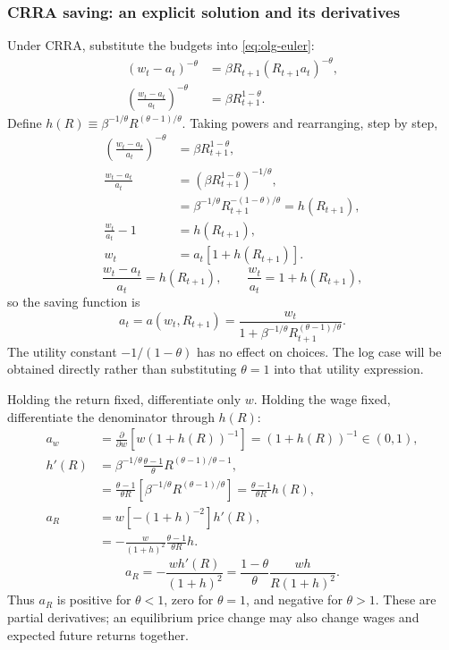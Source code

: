 \subsubsection{CRRA saving: an explicit solution and its derivatives}

Under CRRA, substitute the budgets into \eqref{eq:olg-euler}:
\begin{align}
(w_t-a_t)^{-\theta}
&=\beta R_{t+1}(R_{t+1}a_t)^{-\theta},\\
\left(\frac{w_t-a_t}{a_t}\right)^{-\theta}
&=\beta R_{t+1}^{1-\theta}.
\end{align}
Define $h(R)\equiv\beta^{-1/\theta}R^{(\theta-1)/\theta}$. Taking powers
and rearranging, step by step,
\begin{align}
\left(\frac{w_t-a_t}{a_t}\right)^{-\theta}
 &=\beta R_{t+1}^{1-\theta},\\
\frac{w_t-a_t}{a_t}
 &=(\beta R_{t+1}^{1-\theta})^{-1/\theta},\\
 &=\beta^{-1/\theta}R_{t+1}^{-(1-\theta)/\theta}
  =h(R_{t+1}),\\
\frac{w_t}{a_t}-1&=h(R_{t+1}),\\
w_t&=a_t[1+h(R_{t+1})].
\end{align}
\begin{equation}
\frac{w_t-a_t}{a_t}=h(R_{t+1}),\qquad
\frac{w_t}{a_t}=1+h(R_{t+1}),
\end{equation}
so the saving function is
\begin{equation}\label{eq:olg-saving}
a_t=a(w_t,R_{t+1})
=\frac{w_t}{1+\beta^{-1/\theta}R_{t+1}^{(\theta-1)/\theta}}.
\end{equation}
The utility constant $-1/(1-\theta)$ has no effect on choices. The log case
will be obtained directly rather than substituting $\theta=1$ into that
utility expression.

Holding the return fixed, differentiate only $w$. Holding the wage fixed,
differentiate the denominator through $h(R)$:
\begin{align}
a_w&=\frac{\partial}{\partial w}[w(1+h(R))^{-1}]
       =(1+h(R))^{-1}\in(0,1),\\
h'(R)&=\beta^{-1/\theta}\frac{\theta-1}{\theta}
                 R^{(\theta-1)/\theta-1},\\
 &=\frac{\theta-1}{\theta R}
       [\beta^{-1/\theta}R^{(\theta-1)/\theta}]
  =\frac{\theta-1}{\theta R}h(R),\\
a_R&=w[-(1+h)^{-2}]h'(R),\\
 &=-\frac{w}{(1+h)^2}\frac{\theta-1}{\theta R}h.
\end{align}
\begin{equation}\label{eq:olg-saving-derivatives}
a_R=-\frac{wh'(R)}{(1+h)^2}
=\frac{1-\theta}{\theta}\frac{wh}{R(1+h)^2}.
\end{equation}
Thus $a_R$ is positive for $\theta<1$, zero for $\theta=1$, and negative
for $\theta>1$. These are partial derivatives; an equilibrium price change
may also change wages and expected future returns together.

